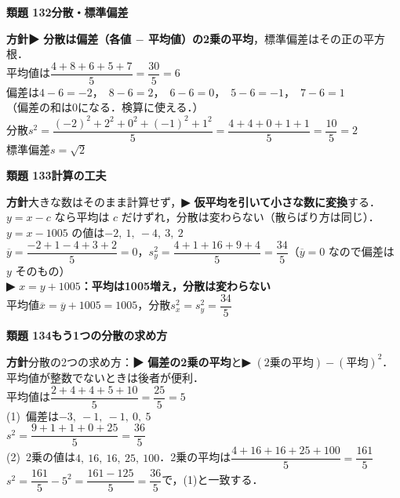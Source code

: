 \documentclass[a4paper,11pt]{ltjsarticle}
\newcommand{\ans}[2]{\Needspace{5\baselineskip}\vspace{6pt}%
  {\sffamily\bfseries 類題 #1\quad #2}\par}
\newcommand{\point}[1]{\textsf{\bfseries ▶ #1}}
\begin{document}
\ans{132}{分散・標準偏差}
\begin{kai}
\textbf{方針}\quad \point{分散は偏差（各値 $-$ 平均値）の2乗の平均}，標準偏差はその正の平方根．\\[2pt]
平均値は\quad $\dfrac{4+8+6+5+7}{5}=\dfrac{30}5=6$\\
偏差は\quad $4-6=-2$，\ $8-6=2$，\ $6-6=0$，\ $5-6=-1$，\ $7-6=1$\\
（偏差の和は0になる．検算に使える．）\\[2pt]
分散\quad $s^2=\dfrac{(-2)^2+2^2+0^2+(-1)^2+1^2}{5}=\dfrac{4+4+0+1+1}{5}=\dfrac{10}5=2$\\
標準偏差\quad $s=\sqrt2$
\end{kai}

\ans{133}{計算の工夫}
\begin{kai}
\textbf{方針}\quad 大きな数はそのまま計算せず，\point{仮平均を引いて小さな数に変換}する．$y=x-c$ なら平均は $c$ だけずれ，分散は変わらない（散らばり方は同じ）．\\[2pt]
$y=x-1005$ の値は\quad $-2,\ 1,\ -4,\ 3,\ 2$\\
$\overline y=\dfrac{-2+1-4+3+2}{5}=0$，\quad $s_y^2=\dfrac{4+1+16+9+4}{5}=\dfrac{34}{5}$\quad （$\overline y=0$ なので偏差は $y$ そのもの）\\[2pt]
\point{$x=y+1005$：平均は1005増え，分散は変わらない}\\
平均値\quad $\overline x=\overline y+1005=1005$，\quad 分散\quad $s_x^2=s_y^2=\dfrac{34}{5}$
\end{kai}

\ans{134}{もう1つの分散の求め方}
\begin{kai}
\textbf{方針}\quad 分散の2つの求め方：\point{偏差の2乗の平均}と\point{$(\text{2乗の平均})-(\text{平均})^2$}．平均値が整数でないときは後者が便利．\\[2pt]
平均値は\quad $\dfrac{2+4+4+5+10}{5}=\dfrac{25}{5}=5$\\[2pt]
(1)\ 偏差は\quad $-3,\ -1,\ -1,\ 0,\ 5$\\
\hspace*{1.5em}$s^2=\dfrac{9+1+1+0+25}{5}=\dfrac{36}{5}$\\[2pt]
(2)\ 2乗の値は\quad $4,\ 16,\ 16,\ 25,\ 100$．2乗の平均は\quad $\dfrac{4+16+16+25+100}{5}=\dfrac{161}{5}$\\
\hspace*{1.5em}$s^2=\dfrac{161}{5}-5^2=\dfrac{161-125}{5}=\dfrac{36}{5}$\quad で，(1)と一致する．
\end{kai}
\end{document}
